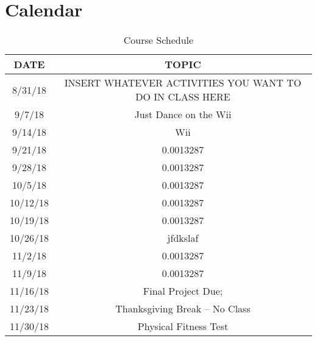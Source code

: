 \documentclass[letterpaper,12pt]{article}
\begin{document}
\section{Calendar}
\begin{table}[ht]
\begin{center}
\caption{Course Schedule}
\label{tbl:bins} %
\begin{tabular}{|cc|}
\hline
\multicolumn{1}{|c}{DATE} & \multicolumn{1}{c|}{TOPIC} \\
\hline
8/31/18 &   INSERT WHATEVER ACTIVITIES YOU WANT TO DO IN CLASS HERE \\
9/7/18 &   Just Dance on the Wii \\
9/14/18 &   Wii \\
9/21/18 &   0.0013287 \\
9/28/18 &   0.0013287 \\
10/5/18 &   0.0013287 \\
10/12/18 &   0.0013287 \\
10/19/18 &   0.0013287 \\
10/26/18 &   jfdkslaf \\
11/2/18 &   0.0013287 \\
11/9/18 &   0.0013287 \\
11/16/18 &   Final Project Due;  \\
11/23/18 &   Thanksgiving Break -- No Class \\
11/30/18 &   Physical Fitness Test \\
\hline
\end{tabular}
\end{center}
\end{table}
\end{document}

